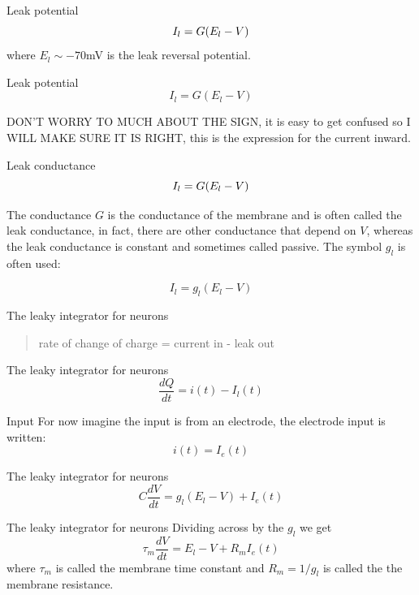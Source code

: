 \documentclass{beamer}
\newcommand{\crish}{\color{reddish}}
\newcommand{\cbla}{\color{black}}
\newcommand{\cred}{\color{red}}
\newcommand{\cblu}{\color{blue}}
\begin{document}
\begin{frame}{Leak potential}
  \crish
  $$I_l=G(\cred{}E_l\crish{}-V)$$
\cbla{}
  where \cred$E_l\sim -70$mV\cbla{} is the \cblu{}leak reversal potential\cbla{}. 
\end{frame}


\begin{frame}{Leak potential}
  \crish
  $$I_l=G(E_l-V)$$
\cbla{}

DON'T WORRY TO MUCH ABOUT THE SIGN, it is easy to get confused so I
WILL MAKE SURE IT IS RIGHT, this is the expression for the current
inward.
\end{frame}



\begin{frame}{Leak conductance}
  \crish
  $$I_l=\cred{}G\crish{}(E_l-V)$$

  \cbla{} The conductance \cred$G$\cbla{} is the conductance of the membrane and is often called the \cblu{}leak conductance\cbla{}, in fact, there are other conductance that depend on \crish$V$\cbla{}, whereas the leak conductance is constant and sometimes called \cblu{}passive\cbla{}. The symbol \cred{}$g_l$\cbla{} is often used:

  \crish
  $$I_l=g_l(E_l-V)$$
\cbla{}
\end{frame}

\begin{frame}{The leaky integrator for neurons}
\begin{quote}
  rate of change of charge = current in - leak out
\end{quote}
\end{frame}

\begin{frame}{The leaky integrator for neurons}
  \crish
  $$\frac{dQ}{dt}=i(t)-I_l(t)$$
  \cbla
\end{frame}

\begin{frame}{Input}
  For now imagine the input is from an electrode, the electrode input is written:\crish
  $$i(t)=I_e(t)$$
  \cbla
\end{frame}

\begin{frame}{The leaky integrator for neurons}
  \crish
  $$C\frac{dV}{dt}=g_l(E_l-V)+I_e(t)$$
  \cbla
\end{frame}


\begin{frame}{The leaky integrator for neurons}
Dividing across by the \crish{}$g_l$\cbla{} we get
  \crish
  $$\tau_m\frac{dV}{dt}=E_l-V+R_mI_e(t)$$
  \cbla
  where \crish$\tau_m$\cbla{} is called the \cblu{}membrane time constant\cbla{} and \crish{}$R_m=1/g_l$\cbla{} is called the \cblu{}the membrane resistance\cbla{}.

\end{frame}
\end{document}
